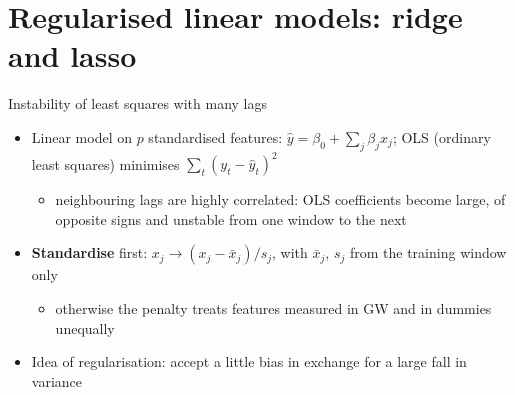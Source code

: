 \section{Regularised linear models: ridge and lasso}

\begin{frame}{Instability of least squares with many lags}
\itemsize{\small}
\begin{itemize}
    \item Linear model on $p$ standardised features: $\hat y = \beta_0 + \sum_j \beta_j x_j$; OLS (ordinary least squares) minimises $\sum_t (y_t - \hat y_t)^2$
    \begin{itemize}
        \item neighbouring lags are highly correlated: OLS coefficients become large, of opposite signs and unstable from one window to the next
    \end{itemize}
    \item \textbf{Standardise} first: $x_j \to (x_j - \bar x_j)/s_j$, with $\bar x_j$, $s_j$ from the training window only
    \begin{itemize}
        \item otherwise the penalty treats features measured in GW and in dummies unequally
    \end{itemize}
    \item Idea of regularisation: accept a little bias in exchange for a large fall in variance
\end{itemize}
\end{frame}

